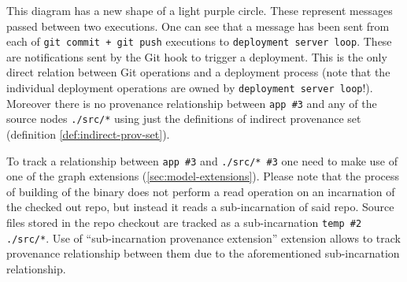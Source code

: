 This diagram has a new shape of a light purple circle. These represent messages passed between two executions. One can see that a message has been sent from each of \texttt{git commit + git push} executions to \texttt{deployment server loop}. These are notifications sent by the Git hook to trigger a deployment. This is the only direct relation between Git operations and a deployment process (note that the individual deployment operations are owned by \texttt{deployment server loop}!). Moreover there is no provenance relationship between \texttt{app \#3} and any of the source nodes \texttt{./src/*} using just the definitions of indirect provenance set (definition \ref{def:indirect-prov-set}).

To track a relationship between \texttt{app \#3} and \texttt{./src/* \#3} one need to make use of one of the graph extensions (\cref{sec:model-extensions}). Please note that the process of building of the binary does not perform a read operation on an incarnation of the checked out repo, but instead it reads a sub-incarnation of said repo. Source files stored in the repo checkout are tracked as a sub-incarnation \texttt{temp \#2 ./src/*}. Use of ``sub-incarnation provenance extension'' extension allows to track provenance relationship between them due to the aforementioned sub-incarnation relationship.

\begin{comment}
DROPPED AS IT IS NOT ESSENTIAL
\subsection{Simple dapper-style execution trace.}

TODO: Use the concepts and graphs to describe how to identify the root cause of the quota error. Pure tracing example, e.g. when a creation request of a VM fails with a quota error.

\subsection{Incorrect flag in production.}

TODO: Use sub-incarnations. Infra as code. Bazel builds kubernetes
\end{comment}

